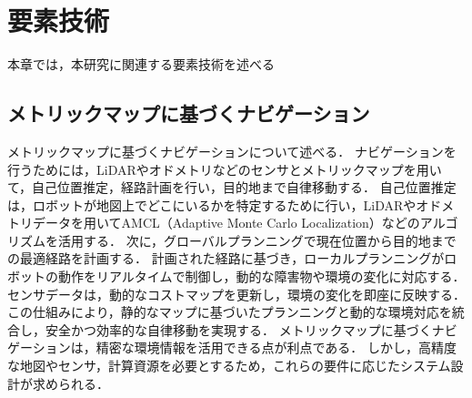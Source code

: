 \chapter{要素技術}
\label{chap:elemental}
本章では，本研究に関連する要素技術を述べる
\section{メトリックマップに基づくナビゲーション}
メトリックマップに基づくナビゲーションについて述べる．
ナビゲーションを行うためには，LiDARやオドメトリなどのセンサとメトリックマップを用いて，自己位置推定，経路計画を行い，目的地まで自律移動する．
自己位置推定は，ロボットが地図上でどこにいるかを特定するために行い，LiDARやオドメトリデータを用いてAMCL（Adaptive Monte Carlo Localization）などのアルゴリズムを活用する．
次に，グローバルプランニングで現在位置から目的地までの最適経路を計画する．
計画された経路に基づき，ローカルプランニングがロボットの動作をリアルタイムで制御し，動的な障害物や環境の変化に対応する．
センサデータは，動的なコストマップを更新し，環境の変化を即座に反映する．この仕組みにより，静的なマップに基づいたプランニングと動的な環境対応を統合し，安全かつ効率的な自律移動を実現する．
メトリックマップに基づくナビゲーションは，精密な環境情報を活用できる点が利点である．
しかし，高精度な地図やセンサ，計算資源を必要とするため，これらの要件に応じたシステム設計が求められる．